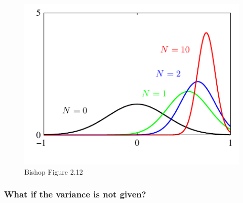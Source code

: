 \begin{figure}
	\centering
	\includegraphics[width=.5\textwidth]{./lecture4/Figure212.pdf}
	\caption{Bishop Figure 2.12}
\end{figure}

\subsubsection{What if the variance is not given?}
